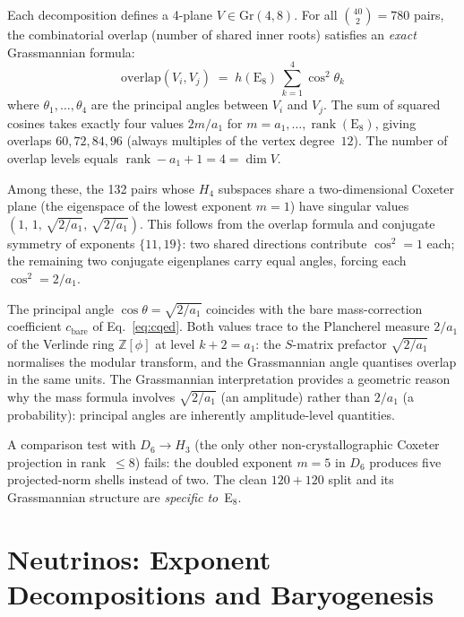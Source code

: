 \documentclass[12pt,a4paper]{article}
\theoremstyle{definition}
\begin{document}
Each decomposition defines a 4-plane $V \in \mathrm{Gr}(4,8)$.  For all $\binom{40}{2} = 780$ pairs, the combinatorial overlap (number of shared inner roots) satisfies an \emph{exact} Grassmannian formula:
\begin{equation}
\mathrm{overlap}(V_i, V_j) \;=\; h(\mathrm{E}_8)\,\sum_{k=1}^{4} \cos^2\theta_k
\label{eq:overlap_grass}
\end{equation}
where $\theta_1, \ldots, \theta_4$ are the principal angles between $V_i$ and $V_j$.  The sum of squared cosines takes exactly four values $2m/a_1$ for $m = a_1, \ldots, \operatorname{rank}(\mathrm{E}_8)$, giving overlaps $60, 72, 84, 96$ (always multiples of the vertex degree~$12$).  The number of overlap levels equals $\operatorname{rank} - a_1 + 1 = 4 = \dim V$.

Among these, the 132 pairs whose $H_4$ subspaces share a two-dimensional Coxeter plane (the eigenspace of the lowest exponent $m = 1$) have singular values $(1,\,1,\,\sqrt{2/a_1},\,\sqrt{2/a_1})$.  This follows from the overlap formula and conjugate symmetry of exponents $\{11, 19\}$: two shared directions contribute $\cos^2 = 1$ each; the remaining two conjugate eigenplanes carry equal angles, forcing each $\cos^2 = 2/a_1$.

The principal angle $\cos\theta = \sqrt{2/a_1}$ coincides with the bare mass-correction coefficient $c_{\mathrm{bare}}$ of Eq.~\eqref{eq:cqed}.  Both values trace to the Plancherel measure $2/a_1$ of the Verlinde ring $\mathbb{Z}[\phi]$ at level $k + 2 = a_1$: the $S$-matrix prefactor $\sqrt{2/a_1}$ normalises the modular transform, and the Grassmannian angle quantises overlap in the same units.  The Grassmannian interpretation provides a geometric reason why the mass formula involves $\sqrt{2/a_1}$ (an amplitude) rather than $2/a_1$ (a probability): principal angles are inherently amplitude-level quantities.

A comparison test with $D_6 \to H_3$ (the only other non-crystallographic Coxeter projection in rank~$\leq 8$) fails: the doubled exponent $m = 5$ in $D_6$ produces five projected-norm shells instead of two.  The clean $120 + 120$ split and its Grassmannian structure are \emph{specific to}~E$_8$.


\section{Neutrinos: Exponent Decompositions and Baryogenesis}
\label{sec:S-neutrinos}
\end{document}
